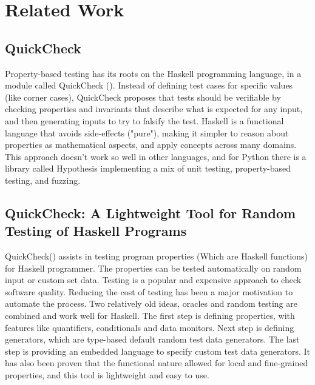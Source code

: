 \documentclass[preprint,nocopyrightspace]{sig-alternate}
\begin{document}


\section{Related Work}

\subsection{QuickCheck}
Property-based testing has its roots on the Haskell programming language,
in a module called QuickCheck (\citet{claessen_quickcheck:_2011}).
Instead of defining test cases for specific values (like corner cases),
QuickCheck proposes that tests should be verifiable by checking properties and invariants that describe what is expected for any input,
and then generating inputs to try to falsify the test.
Haskell is a functional language that avoids side-effects ("pure"),
making it simpler to reason about properties as mathematical aspects,
and apply concepts across many domains.
This approach doesn't work so well in other languages,
and for Python there is a library called Hypothesis implementing a mix of unit testing,
property-based testing,
and fuzzing.

\subsection{QuickCheck: A Lightweight Tool for Random Testing of Haskell Programs}
QuickCheck(\citet{claessen_quickcheck:_2011}) assists in testing program properties (Which are Haskell functions) for Haskell programmer.
The properties can be tested automatically on random input or custom set data.
Testing is a popular and expensive approach to check software quality.
Reducing the cost of testing has been a major motivation to automate the process.
Two relatively old ideas, oracles and random testing are combined and work well for Haskell.
The first step is defining properties, with features like quantifiers, conditionals and data monitors.
Next step is defining generators, which are type-based default random test data generators.
The last step is providing an embedded language to specify custom test data generators.
It has also been proven that the functional nature allowed for local and fine-grained properties,
and this tool is lightweight and easy to use.
\end{document}
